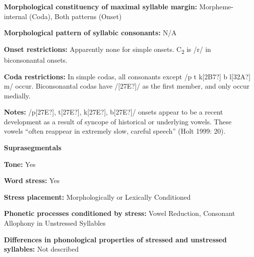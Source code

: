 \begin{styleBody}
\textbf{Morphological constituency of maximal syllable margin:} Morpheme-internal (Coda), Both patterns (Onset)
\end{styleBody}

\begin{styleBody}
\textbf{Morphological pattern of syllabic consonants:} N/A
\end{styleBody}

\begin{styleBody}
\textbf{Onset restrictions: }Apparently none for simple onsets. C\textsubscript{2} is /r/ in biconsonantal onsets.
\end{styleBody}

\begin{styleBody}
\textbf{Coda restrictions: }In simple codas, all consonants except /p t k[2B7?] b l[32A?] m/ occur. Biconsonantal codas have /[27E?]/ as the first member, and only occur medially.
\end{styleBody}

\begin{styleBody}
\textbf{Notes: }/p[27E?], t[27E?], k[27E?], b[27E?]/ onsets appear to be a recent development as a result of syncope of historical or underlying vowels. These vowels “often reappear in extremely slow, careful speech” (Holt 1999: 20).
\end{styleBody}

\begin{styleBody}
\textbf{Suprasegmentals}
\end{styleBody}

\begin{styleBody}
\textbf{Tone:} Yes
\end{styleBody}

\begin{styleBody}
\textbf{Word stress:} Yes
\end{styleBody}

\begin{styleBody}
\textbf{Stress placement:} Morphologically or Lexically Conditioned
\end{styleBody}

\begin{styleBody}
\textbf{Phonetic processes conditioned by stress:} Vowel Reduction, Consonant Allophony in Unstressed Syllables
\end{styleBody}

\begin{styleBody}
\textbf{Differences in phonological properties of stressed and unstressed syllables:} Not described
\end{styleBody}


